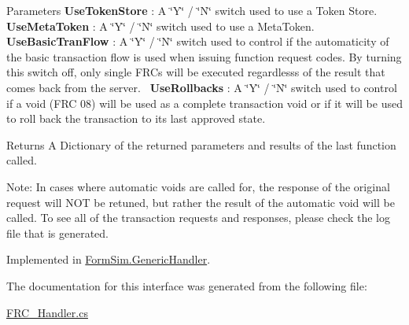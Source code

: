 \begin{DoxyParams}{Parameters}
 {\bfseries Use\+Token\+Store} \+: A \char`\"{}\+Y\char`\"{} / \char`\"{}\+N\char`\"{} switch used to use a Token Store.~\newline
 {\bfseries Use\+Meta\+Token} \+: A \char`\"{}\+Y\char`\"{} / \char`\"{}\+N\char`\"{} switch used to use a Meta\+Token.~\newline
 {\bfseries Use\+Basic\+Tran\+Flow} \+: A \char`\"{}\+Y\char`\"{} / \char`\"{}\+N\char`\"{} switch used to control if the automaticity of the basic transaction flow is used when issuing function request codes. By turning this switch off, only single F\+R\+Cs will be executed regardlesss of the result that comes back from the server.~\newline
 {\bfseries Use\+Rollbacks} \+: A \char`\"{}\+Y\char`\"{} / \char`\"{}\+N\char`\"{} switch used to control if a void (F\+RC 08) will be used as a complete transaction void or if it will be used to roll back the transaction to it\textquotesingle{}s last approved state.~\newline
 \\
\hline
\end{DoxyParams}
\begin{DoxyReturn}{Returns}
A Dictionary of the returned parameters and results of the last function called. 

Note\+: In cases where automatic voids are called for, the response of the original request will N\+OT be retuned, but rather the result of the automatic void will be called. To see all of the transaction requests and responses, please check the log file that is generated.
\end{DoxyReturn}


Implemented in \mbox{\hyperlink{class_form_sim_1_1_generic_handler_affac9485687a2be1595405d657922532}{Form\+Sim.\+Generic\+Handler}}.



The documentation for this interface was generated from the following file\+:\begin{DoxyCompactItemize}
\item 
\mbox{\hyperlink{_f_r_c___handler_8cs}{F\+R\+C\+\_\+\+Handler.\+cs}}\end{DoxyCompactItemize}
